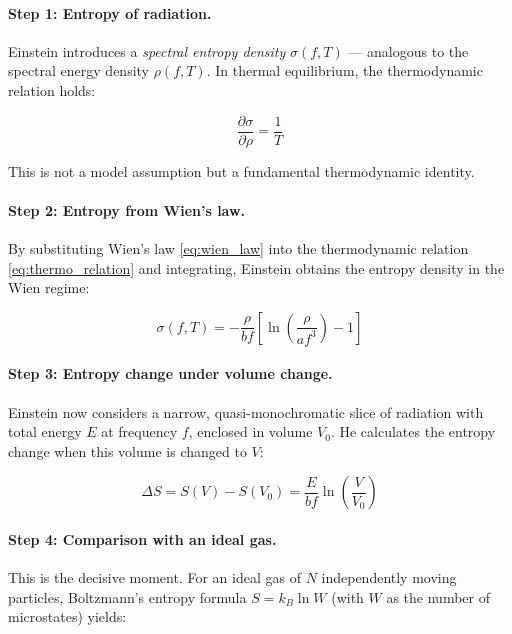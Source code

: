 \paragraph{Step 1: Entropy of radiation.}
Einstein introduces a \emph{spectral entropy density} $\sigma(f, T)$ — analogous 
to the spectral energy density $\rho(f, T)$. In thermal equilibrium, the 
thermodynamic relation holds:

\begin{equation}
    \frac{\partial \sigma}{\partial \rho} = \frac{1}{T}
    \label{eq:thermo_relation}
\end{equation}

This is not a model assumption but a fundamental thermodynamic identity.

\paragraph{Step 2: Entropy from Wien's law.}
By substituting Wien's law \eqref{eq:wien_law} into the thermodynamic relation 
\eqref{eq:thermo_relation} and integrating, Einstein obtains the entropy density 
in the Wien regime:

\begin{equation}
    \sigma(f, T) = -\frac{\rho}{bf} \left[\ln\!\left(\frac{\rho}{af^3}\right) - 1\right]
    \label{eq:entropy_density}
\end{equation}

\paragraph{Step 3: Entropy change under volume change.}
Einstein now considers a narrow, quasi-monochromatic slice of radiation with total 
energy $E$ at frequency $f$, enclosed in volume $V_0$. He calculates the entropy 
change when this volume is changed to $V$:

\begin{equation}
    \Delta S = S(V) - S(V_0) = \frac{E}{bf} \ln\!\left(\frac{V}{V_0}\right)
    \label{eq:entropy_change}
\end{equation}

\paragraph{Step 4: Comparison with an ideal gas.}
This is the decisive moment. For an ideal gas of $N$ independently moving particles, 
Boltzmann's entropy formula $S = k_B \ln W$ (with $W$ as the number of microstates) 
yields:

